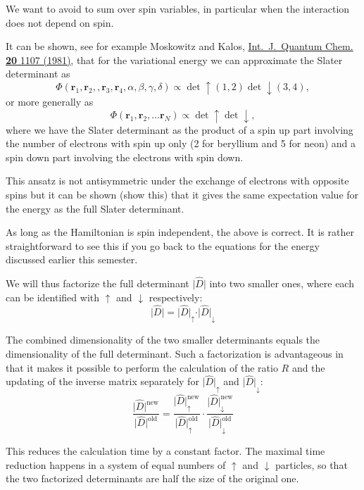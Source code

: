 We want to avoid to sum over spin variables, in particular when the interaction does not depend on spin.

It can be shown, see for example Moskowitz and Kalos, \href{{http://onlinelibrary.wiley.com/doi/10.1002/qua.560200508/abstract}}{Int.~J.~Quantum Chem. \textbf{20} 1107 (1981)}, that for the variational energy
we can approximate the Slater determinant as  
\[
   \Phi(\mathbf{r}_1,\mathbf{r}_2,,\mathbf{r}_3,\mathbf{r}_4, \alpha,\beta,\gamma,\delta) \propto \det\uparrow(1,2)\det\downarrow(3,4),
\]
or more generally as 
\[
   \Phi(\mathbf{r}_1,\mathbf{r}_2,\dots \mathbf{r}_N) \propto \det\uparrow \det\downarrow,
\]
where we have the Slater determinant as the product of a spin up part involving the number of electrons with spin up only (2 for beryllium and 5 for neon) and a spin down part involving the electrons with spin down.

This ansatz is not antisymmetric under the exchange of electrons with  opposite spins but it can be shown (show this) that it gives the same
expectation value for the energy as the full Slater determinant.

As long as the Hamiltonian is spin independent, the above is correct. It is rather straightforward to see this if you go back to the equations for the energy discussed earlier  this semester.

We will thus
factorize the full determinant $\vert\hat{D}\vert$ into two smaller ones, where 
each can be identified with $\uparrow$ and $\downarrow$
respectively:
\[
\vert\hat{D}\vert = \vert\hat{D}\vert_\uparrow\cdot \vert\hat{D}\vert_\downarrow
\]

The combined dimensionality of the two smaller determinants equals the
dimensionality of the full determinant. Such a factorization is
advantageous in that it makes it possible to perform the calculation
of the ratio $R$ and the updating of the inverse matrix separately for
$\vert\hat{D}\vert_\uparrow$ and $\vert\hat{D}\vert_\downarrow$:
\[
\frac{\vert\hat{D}\vert^\mathrm{new}}{\vert\hat{D}\vert^\mathrm{old}} =
\frac{\vert\hat{D}\vert^\mathrm{new}_\uparrow}
{\vert\hat{D}\vert^\mathrm{old}_\uparrow}\cdot
\frac{\vert\hat{D}\vert^\mathrm{new}_\downarrow
}{\vert\hat{D}\vert^\mathrm{old}_\downarrow}
\]

This reduces the calculation time by a constant factor. The maximal
time reduction happens in a system of equal numbers of $\uparrow$ and
$\downarrow$ particles, so that the two factorized determinants are
half the size of the original one.

